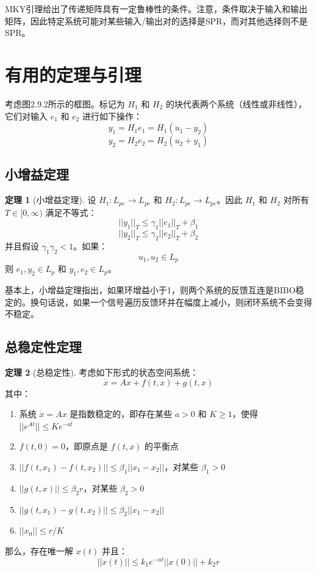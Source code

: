 \documentclass[UTF8,12pt,a4paper]{ctexart}
\theoremstyle{definition}
\newtheorem{theorem}{定理}[section]
\begin{document}
MKY引理给出了传递矩阵具有一定鲁棒性的条件。注意，条件取决于输入和输出矩阵，因此特定系统可能对某些输入/输出对的选择是SPR，而对其他选择则不是SPR。

\section{有用的定理与引理}

考虑图2.9.2所示的框图。标记为 $H_1$ 和 $H_2$ 的块代表两个系统（线性或非线性），它们对输入 $e_1$ 和 $e_2$ 进行如下操作：
\[
y_1 = H_1 e_1 = H_1(u_1 - y_2)
\]
\[
y_2 = H_2 e_2 = H_2(u_2 + y_1)
\]

\subsection{小增益定理}

\begin{theorem}[小增益定理]
设 $H_1: L_{pe} \rightarrow L_{pe}$ 和 $H_2: L_{pe} \rightarrow L_{pe}$。因此 $H_1$ 和 $H_2$ 对所有 $T \in [0, \infty)$ 满足不等式：
\[
||y_1||_T \leq \gamma_1 ||e_1||_T + \beta_1
\]
\[
||y_2||_T \leq \gamma_2 ||e_2||_T + \beta_2
\]
并且假设 $\gamma_1 \gamma_2 < 1$。如果：
\[
u_1, u_2 \in L_p\]
则 $e_1, y_2 \in L_p$ 和 $y_1, e_2 \in L_p$。
\end{theorem}

基本上，小增益定理指出，如果环增益小于1，则两个系统的反馈互连是BIBO稳定的。换句话说，如果一个信号遍历反馈环并在幅度上减小，则闭环系统不会变得不稳定。

\subsection{总稳定性定理}

\begin{theorem}[总稳定性]
考虑如下形式的状态空间系统：
\[
\dot{x} = Ax + f(t, x) + g(t, x)
\]
其中：
\begin{enumerate}
\item 系统 $\dot{x} = Ax$ 是指数稳定的，即存在某些 $a > 0$ 和 $K \geq 1$，使得 $||e^{At}|| \leq Ke^{-at}$
\item $f(t, 0) = 0$，即原点是 $f(t, x)$ 的平衡点
\item $||f(t, x_1) - f(t, x_2)|| \leq \beta_1 ||x_1 - x_2||$，对某些 $\beta_1 > 0$
\item $||g(t, x)|| \leq \beta_2 r$，对某些 $\beta_2 > 0$
\item $||g(t, x_1) - g(t, x_2)|| \leq \beta_2 ||x_1 - x_2||$
\item $||x_0|| \leq r/K$
\end{enumerate}
那么，存在唯一解 $x(t)$ 并且：
\[
||x(t)|| \leq k_1 e^{-\alpha t} ||x(0)|| + k_2 r
\]
\end{theorem}
\end{document}
